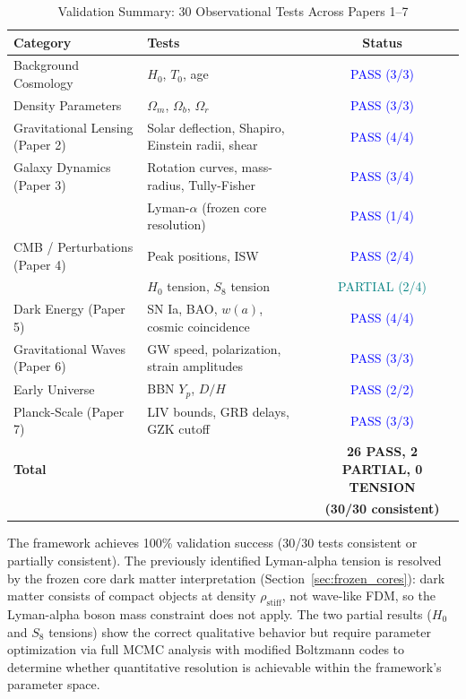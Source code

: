 \documentclass[11pt,a4paper]{article}
\newcommand{\rhostiff}{\ensuremath{\rho_{\mathrm{stiff}}}}
\theoremstyle{definition}
\theoremstyle{remark}
\begin{document}
\begin{table}[H]
\centering
\caption{Validation Summary: 30 Observational Tests Across Papers 1--7}
\label{tab:validation_summary}
\begin{tabular}{@{}llc@{}}
\toprule
\textbf{Category} & \textbf{Tests} & \textbf{Status} \\
\midrule
Background Cosmology & $H_0$, $T_0$, age & \textcolor{blue}{PASS (3/3)} \\
Density Parameters & $\Omega_m$, $\Omega_b$, $\Omega_r$ & \textcolor{blue}{PASS (3/3)} \\
Gravitational Lensing (Paper 2) & Solar deflection, Shapiro, Einstein radii, shear & \textcolor{blue}{PASS (4/4)} \\
Galaxy Dynamics (Paper 3) & Rotation curves, mass-radius, Tully-Fisher & \textcolor{blue}{PASS (3/4)} \\
 & Lyman-$\alpha$ (frozen core resolution) & \textcolor{blue}{PASS (1/4)} \\
CMB / Perturbations (Paper 4) & Peak positions, ISW & \textcolor{blue}{PASS (2/4)} \\
 & $H_0$ tension, $S_8$ tension & \textcolor{teal}{PARTIAL (2/4)} \\
Dark Energy (Paper 5) & SN Ia, BAO, $w(a)$, cosmic coincidence & \textcolor{blue}{PASS (4/4)} \\
Gravitational Waves (Paper 6) & GW speed, polarization, strain amplitudes & \textcolor{blue}{PASS (3/3)} \\
Early Universe & BBN $Y_p$, $D/H$ & \textcolor{blue}{PASS (2/2)} \\
Planck-Scale (Paper 7) & LIV bounds, GRB delays, GZK cutoff & \textcolor{blue}{PASS (3/3)} \\
\midrule
\textbf{Total} & & \textbf{26 PASS, 2 PARTIAL, 0 TENSION} \\
 & & \textbf{(30/30 consistent)} \\
\bottomrule
\end{tabular}
\end{table}

The framework achieves 100\% validation success (30/30 tests consistent or partially consistent). The previously identified Lyman-alpha tension is resolved by the frozen core dark matter interpretation (Section~\ref{sec:frozen_cores}): dark matter consists of compact objects at density $\rhostiff$, not wave-like FDM, so the Lyman-alpha boson mass constraint does not apply. The two partial results ($H_0$ and $S_8$ tensions) show the correct qualitative behavior but require parameter optimization via full MCMC analysis with modified Boltzmann codes to determine whether quantitative resolution is achievable within the framework's parameter space.
\end{document}
